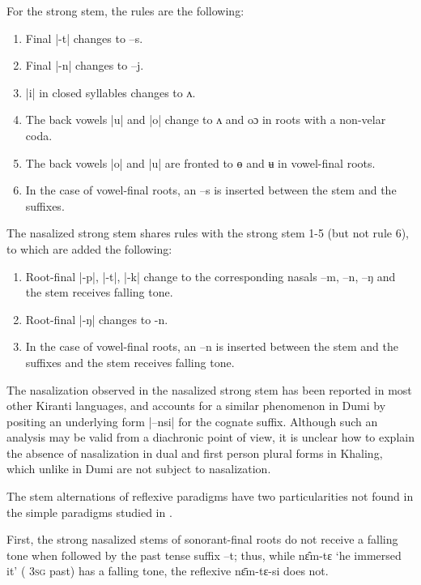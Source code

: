 \documentclass[twoside,a4paper,11pt]{article}
\newcommand{\ipa}[1]{{\phon#1}}
\begin{document}
For the strong stem, the rules are the following:

\begin{enumerate}
\item Final  |\ipa{-t}|  changes to --\ipa{s}.
\item Final  |\ipa{-n}|  changes to --\ipa{j}.
\item |\ipa{i}| in closed syllables changes to \ipa{ʌ}.
\item The back vowels |\ipa{u}| and |\ipa{o}|    change  to \ipa{ʌ} and \ipa{oɔ} in roots with a non-velar coda.
\item The back vowels |\ipa{o}| and |\ipa{u}| are fronted to \ipa{ɵ} and \ipa{ʉ} in vowel-final roots.
\item In the case of vowel-final roots, an --\ipa{s} is inserted between the stem and the suffixes.
\end{enumerate}
The nasalized strong stem shares  rules with the strong stem 1-5 (but not rule 6), to which are added the following:
\begin{enumerate}
\item Root-final  |\ipa{-p}|, |\ipa{-t}|, |\ipa{-k}| change to the corresponding nasals \ipa{--m}, \ipa{--n}, \ipa{--ŋ} and the stem receives falling tone.
\item Root-final |\ipa{-ŋ}| changes to \ipa{-n}.
\item In the case of vowel-final roots, an --\ipa{n} is inserted between the stem and the suffixes and the stem receives falling tone.
\end{enumerate}
The nasalization observed in the nasalized strong stem has been reported in most other Kiranti languages, and \citet[127]{driem93dumi} accounts for a similar phenomenon in Dumi by positing an underlying form |\ipa{--nsi}| for the cognate suffix. Although such an analysis may be valid from a diachronic point of view, it is unclear how to explain the absence of nasalization in dual and first person plural forms in Khaling, which unlike in Dumi are not subject to nasalization.

The stem alternations of reflexive paradigms have two particularities not found in the simple paradigms studied in \citet{jacques12khaling}. 

First, the strong nasalized stems of sonorant-final roots do  not receive a falling tone when followed by the past tense suffix --\ipa{t}; thus, while \ipa{nɛ̂m-tɛ} `he immersed it' ( \textsc{3sg} past) has a falling tone, the reflexive \ipa{nɛ̄m-tɛ-si} does not.
\end{document}
